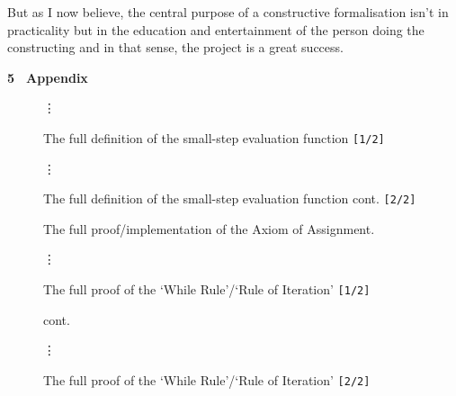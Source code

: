 \documentclass[oneside,12pt]{article}
\newcommand{\impcode}[1]{\textsc{\texttt{#1}}}
\begin{document}
But as I now believe, the central purpose of a constructive formalisation isn't in practicality but in the education and entertainment of the person doing the constructing and in that sense, the project is a great success.






\pagebreak


\begin{centering}

  \vspace*{\fill}
  \textbf{\huge 5 \, Appendix}
  \vspace*{\fill}
  
\end{centering}


\pagebreak


\begin{figure}
  \caption{The full definition of the small-step evaluation function \;\; \impcode{[1/2]}}
  \label{fig:eval-full}
  \centering
  
  {\centering \hfill \Huge{\vdots} \hfill }
\end{figure}

\begin{figure}\ContinuedFloat
  \caption{The full definition of the small-step evaluation function cont. \;\; \impcode{[2/2]}}
  \centering
  { \hfill \Huge{\vdots} \hfill }
  
\end{figure}


\begin{figure}
  \caption{The full proof/implementation of the Axiom of Assignment.}
  \label{fig:axiom-of-assi-proof}
  {\centering }
\end{figure}



\begin{figure}
  \caption{The full proof of the `While Rule'/`Rule of Iteration' \;\; \impcode{[1/2]}}
  \label{fig:while-rule-proof}
  \centering
  
  {\centering \hfill \Huge{\vdots} \hfill }
\end{figure}

\begin{figure}\ContinuedFloat
  \caption{The full proof of the `While Rule'/`Rule of Iteration' \;\; \impcode{[2/2]}}
  \vspace{-0.8cm}
  \begin{center}\!\!\!\small{cont.}\end{center}
  {\centering \hfill \Huge{\vdots} \hfill }
   \centering
   
\end{figure}
\end{document}
